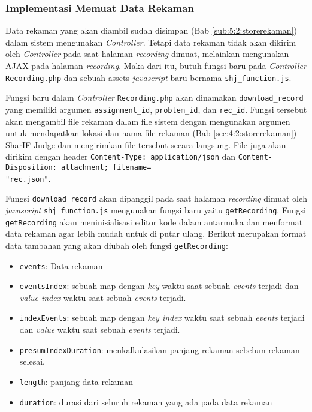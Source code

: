 \subsubsection{Implementasi Memuat Data Rekaman}
\label{ssub:5:2:4:memuatdata}

Data rekaman yang akan diambil sudah disimpan (Bab \ref{sub:5:2:storerekaman}) dalam sistem mengunakan \textit{Controller}. Tetapi data rekaman tidak akan dikirim oleh \textit{Controller} pada saat halaman \textit{recording} dimuat, melainkan mengunakan AJAX pada halaman \textit{recording}. Maka dari itu, butuh fungsi baru pada \textit{Controller} \verb|Recording.php| dan sebuah assets \textit{javascript} baru bernama \verb|shj_function.js|.

Fungsi baru dalam \textit{Controller} \verb|Recording.php| akan dinamakan \verb|download_record| yang memiliki argumen \verb|assignment_id|, \verb|problem_id|, dan \verb|rec_id|. Fungsi tersebut akan mengambil file rekaman dalam file sistem dengan mengunakan argumen untuk mendapatkan lokasi dan nama file rekaman (Bab \ref{sec:4:2:storerekaman}) SharIF-Judge dan mengirimkan file tersebut secara langsung. File juga akan dirikim dengan header \verb|Content-Type: application/json| dan \verb|Content-Disposition: attachment; filename=|\\\verb|"rec.json"|.

Fungsi \verb|download_record| akan dipanggil pada saat halaman \textit{recording} dimuat oleh \textit{javascript} \verb|shj_function.js| mengunakan fungsi baru yaitu \verb|getRecording|. Fungsi \verb|getRecording| akan meninisialisasi editor kode dalam antarmuka dan menformat data rekaman agar lebih mudah untuk di putar ulang. Berikut merupakan format data tambahan yang akan diubah oleh fungsi \verb|getRecording|:

\begin{itemize}
    \item \verb|events|: Data rekaman
    \item \verb|eventsIndex|: sebuah map dengan \textit{key} waktu saat sebuah \textit{events} terjadi dan \textit{value index} waktu saat sebuah \textit{events} terjadi.
    \item \verb|indexEvents|: sebuah map dengan \textit{key index} waktu saat sebuah \textit{events} terjadi dan \textit{value} waktu saat sebuah \textit{events} terjadi.
    \item \verb|presumIndexDuration|: menkalkulasikan panjang rekaman sebelum rekaman selesai.
    \item \verb|length|: panjang data rekaman
    \item \verb|duration|: durasi dari seluruh rekaman yang ada pada data rekaman
\end{itemize}

